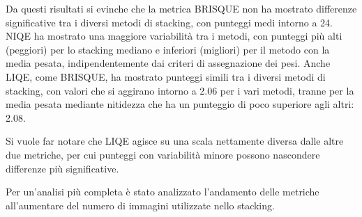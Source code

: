 Da questi risultati si evinche che la metrica BRISQUE non ha mostrato differenze significative tra i diversi metodi di stacking, con punteggi medi intorno a 24. NIQE ha mostrato una maggiore variabilità tra i metodi, con punteggi più alti (peggiori) per lo stacking mediano e inferiori (migliori) per il metodo con la media pesata, indipendentemente dai criteri di assegnazione dei pesi. Anche LIQE, come BRISQUE, ha mostrato punteggi simili tra i diversi metodi di stacking, con valori che si aggirano intorno a 2.06 per i vari metodi, tranne per la media pesata mediante nitidezza che ha un punteggio di poco superiore agli altri: 2.08.

Si vuole far notare che LIQE agisce su una scala nettamente diversa dalle altre due metriche, per cui punteggi con variabilità minore possono nascondere differenze più significative.

Per un'analisi più completa è stato analizzato l'andamento delle metriche all'aumentare del numero di immagini utilizzate nello stacking.

